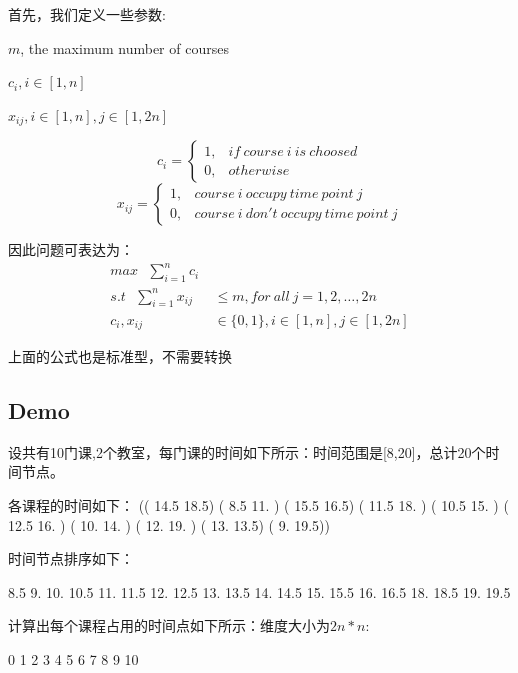 \documentclass[UTF8,a4paper,12pt]{article}
\begin{document}
\begin{CJK}{UTF8}{gkai}
		首先，我们定义一些参数:

			$ m $, the maximum number of courses
			
			$ c_i,i\in[1,n] $
			
			$ x_{ij},i\in[1,n],j\in[1,2n] $

		\begin{equation*}
			c_i = \left\{
			\begin{array}{rlc}
			1, &if\ course\ i\ is\ choosed  \\
			0, &otherwise 
			\end{array}
			\right.
		\end{equation*}
		\begin{equation*}
			x_{ij} =\left\{
				\begin{array}{rlc}
					1, &course\ i\ occupy\ time\ point\ j\\
					0, &course\ i\ don't\ occupy\ time\ point\ j 
				\end{array}
			\right. 
		\end{equation*}
		
		
		因此问题可表达为：
			\begin{equation*}
				\begin{array}{rlc}
					max\ \ \    \sum_{i=1}^{n}c_i\ & \\
					s.t\ \ \   \sum_{i=1}^{n}x_{ij} &\le m ,for\ all\ j=1,2,\dots,2n\\
					      c_{i},x_{ij} &\in \{0,1\} , i\in[1,n],j\in[1,2n] 
				\end{array}
			\end{equation*}
			
		上面的公式也是标准型，不需要转换
		
	\subsection{Demo}
		设共有10门课,2个教室，每门课的时间如下所示：时间范围是[8,20]，总计20个时间节点。
	
	各课程的时间如下：
		(( 14.5  18.5)
(  8.5  11. )
( 15.5  16.5)
( 11.5  18. )
( 10.5  15. )
( 12.5  16. )
( 10.   14. )
( 12.   19. )
( 13.   13.5)
(  9.   19.5))
		
		时间节点排序如下：
		
	8.5   9.   10.   10.5  11.   11.5  12.   12.5  13.   13.5  14.   14.5	15.   15.5  16.   16.5  18.   18.5  19.   19.5

	计算出每个课程占用的时间点如下所示：维度大小为$ 2n*n $:
	
	   0  1  2  3  4  5  6  7  8  9 10
	   

\end{CJK}
\end{document}
